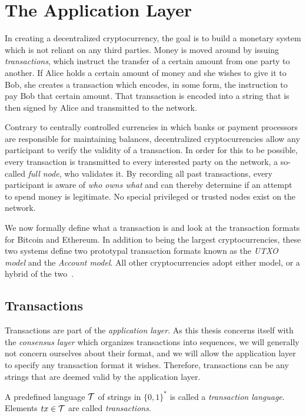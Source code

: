 \section{The Application Layer}
In creating a decentralized cryptocurrency, the goal is to build a monetary
system which is not reliant on any third parties.
Money is moved around by issuing \emph{transactions}, which instruct the
transfer of a certain amount from one party to another. If Alice holds a
certain amount of money and she wishes to give it to Bob, she creates a
transaction which encodes, in some form, the instruction to pay Bob that certain
amount. That transaction is encoded into a string that is then signed by Alice
and transmitted to the network.

Contrary to centrally controlled currencies in which banks or payment processors
are responsible for maintaining balances, decentralized cryptocurrencies allow
any participant to verify the validity of a transaction. In order for this to be
possible, every transaction is transmitted to every interested party on the
network, a so-called \emph{full node}, who validates it. By recording all past
transactions, every participant is aware of \emph{who owns what} and can thereby
determine if an attempt to spend money is legitimate. No special privileged or
trusted nodes exist on the network.

We now formally define what a transaction is and look at the transaction formats
for Bitcoin and Ethereum. In addition to being the largest cryptocurrencies,
these two systems define two prototypal transaction formats known as the
\emph{UTXO model} and the \emph{Account model}. All other cryptocurrencies adopt
either model, or a hybrid of the two~\cite{chimeric}.

\subsection{Transactions}
Transactions are part of the
\emph{application layer}. As this thesis concerns
itself with the \emph{consensus layer} which organizes transactions into
sequences, we will generally not concern ourselves about their format, and we
will allow the application layer to specify any transaction format it wishes.
Therefore, transactions can be any strings that are deemed valid by the
application layer.

\begin{definition}[Transaction]
  A predefined language $\mathcal{T}$ of strings in $\{0, 1\}^*$ is called
  a \emph{transaction language}. Elements $tx \in \mathcal{T}$ are called
  \emph{transactions}.
\end{definition}

